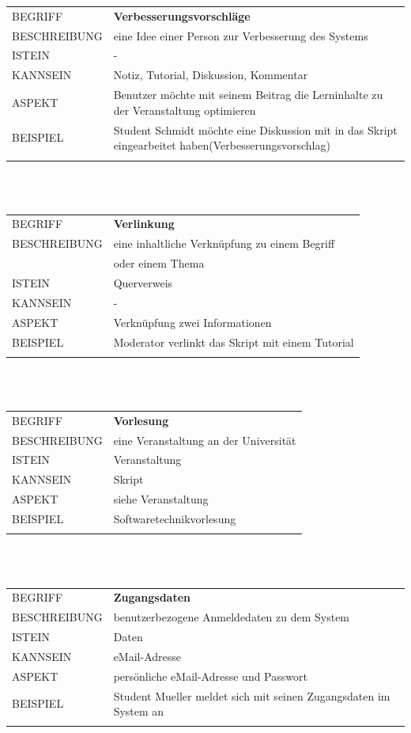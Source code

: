 \documentclass[12pt,a4paper]{article}
\begin{document}
\begin{tabular}{l p{12cm}}
BEGRIFF 	 & \textbf{Verbesserungsvorschläge} \\ 
BESCHREIBUNG & eine Idee einer Person zur Verbesserung des Systems\\ 
ISTEIN   	 & - \\
KANNSEIN 	 & Notiz, Tutorial, Diskussion, Kommentar\\ 
ASPEKT   	 & Benutzer möchte mit seinem Beitrag die Lerninhalte zu der 					   Veranstaltung optimieren\\
BEISPIEL 	 & Student Schmidt möchte eine Diskussion mit in das Skript 					   eingearbeitet haben(Verbesserungsvorschlag)\\\\
\hline
\end{tabular}\\\\

\begin{tabular}{l p{12cm}} 
BEGRIFF 	 & \textbf{Verlinkung} \\ 
BESCHREIBUNG & eine inhaltliche Verknüpfung zu einem Begriff\\
			 & oder einem Thema\\ 
ISTEIN   	 & Querverweis\\
KANNSEIN 	 & -\\ 
ASPEKT   	 & Verknüpfung zwei Informationen\\
BEISPIEL 	 & Moderator verlinkt das Skript mit einem Tutorial\\\\
\hline
\end{tabular}\\\\ 

\begin{tabular}{l p{12cm}} 
BEGRIFF 	 & \textbf{Vorlesung} \\ 
BESCHREIBUNG & eine Veranstaltung an der Universität\\ 
ISTEIN   	 & Veranstaltung\\
KANNSEIN 	 & Skript\\ 
ASPEKT   	 & siehe Veranstaltung\\
BEISPIEL 	 & Softwaretechnikvorlesung\\\\
\hline
\end{tabular}\\\\  

\begin{tabular}{l p{12cm}}
BEGRIFF 	 & \textbf{Zugangsdaten} \\ 
BESCHREIBUNG & benutzerbezogene Anmeldedaten zu dem System\\ 
ISTEIN   	 & Daten\\
KANNSEIN 	 & eMail-Adresse\\  
ASPEKT   	 & persönliche eMail-Adresse und Passwort\\
BEISPIEL 	 & Student Mueller meldet sich mit seinen Zugangsdaten im System 				   an\\\\
\hline
\end{tabular}\\\\  
\end{document}
